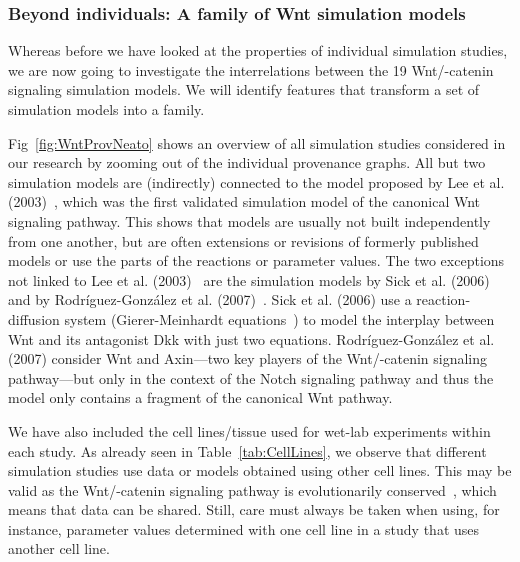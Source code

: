 \documentclass[10pt,letterpaper]{article}
\newcommand{\bcat}{\textbeta-catenin}
\newcommand{\wnt}{Wnt}
\newcommand{\lee}{Lee et al. (2003)}
\begin{document}
\subsubsection*{Beyond individuals: A family of \wnt{} simulation models}


Whereas before we have looked at the properties of individual simulation studies, we are now going to investigate the interrelations between the 19 \wnt{}/\bcat{} signaling simulation models.
We will identify features that transform a set of simulation models into a family.


Fig~\ref{fig:WntProvNeato} shows an overview of all simulation studies considered in our research by zooming out of the individual provenance graphs.
All but two simulation models are (indirectly) connected to the model proposed by \lee{}~\cite{Lee2003}, which was the first validated simulation model of the canonical \wnt{} signaling pathway.
This shows that models are usually not built independently from one another, but are often extensions or revisions of formerly published models or use the parts of the reactions or parameter values.
The two exceptions not linked to \lee{}~\cite{Lee2003} are the simulation models by Sick et al. (2006)~\cite{Sick2006} and by Rodríguez-González et al. (2007)~\cite{Rodriguez2007}. 
Sick et al. (2006) use a reaction-diffusion system (Gierer-Meinhardt equations~\cite{Gierer1972}) to model the interplay between \wnt{} and its antagonist Dkk with just two equations.
Rodríguez-González et al. (2007) consider \wnt{} and Axin---two key players of the \wnt{}/\bcat{} signaling pathway---but only in the context of the Notch signaling pathway and thus the model only contains a fragment of the canonical \wnt{} pathway.

We have also included the cell lines/tissue used for wet-lab experiments within each study.
As already seen in Table~\ref{tab:CellLines}, we observe that different simulation studies use data or models obtained using other cell lines.
This may be valid as the \wnt{}/\bcat{} signaling pathway is evolutionarily conserved~\cite{Steinhart2018}, which means that data can be shared. Still, care must always be taken when using, for instance, parameter values determined with one cell line in a study that uses another cell line.
\end{document}
